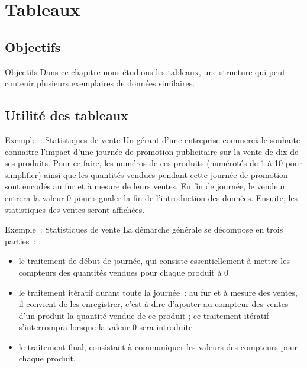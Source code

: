 \section{Tableaux}

\subsection{Objectifs}

\begin{frame}{Objectifs}
	Dans ce chapitre nous étudions les tableaux, 
	une structure qui peut contenir 
	plusieurs exemplaires de données similaires.
\end{frame}

\subsection{Utilité des tableaux}

\begin{frame}{Exemple~: Statistiques de vente}
	Un gérant d’une entreprise commerciale souhaite connaitre l’impact d’une
		journée de promotion publicitaire sur la vente de dix de ses produits.
		Pour ce faire, les numéros de ces produits (numérotés de 1 à 10 pour
		simplifier) ainsi que les quantités vendues pendant cette journée de
		promotion sont encodés au fur et à mesure de leurs ventes. En fin de
		journée, le vendeur entrera la valeur 0 pour signaler la fin de
		l’introduction des données. Ensuite, les statistiques des ventes seront
		affichées.
\end{frame}

\begin{frame}{Exemple~: Statistiques de vente}
	La démarche générale se décompose en trois parties~:

	\begin{itemize}
	\item {
		le traitement de début de journée, qui consiste essentiellement à mettre
		les compteurs des quantités vendues pour chaque produit à 0}
		\item {
		le traitement itératif durant toute la journée~: au fur et à mesure des
		ventes, il convient de les enregistrer, c’est-à-dire d’ajouter au
		compteur des ventes d’un produit la quantité vendue de ce produit ; ce
		traitement itératif s’interrompra lorsque la valeur 0 sera introduite}
	\item {
		le traitement final, consistant à communiquer les valeurs des compteurs
		pour chaque produit.}
	\end{itemize}
\end{frame}

